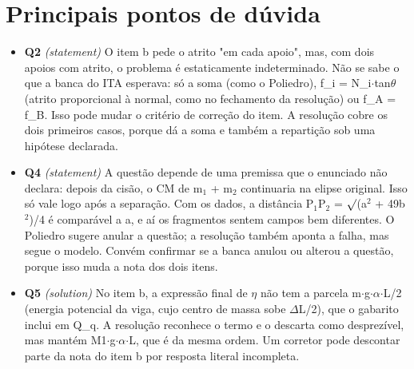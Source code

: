 \documentclass{article}%
\begin{document}
\section*{Principais pontos de dúvida}%
\begin{itemize}%
\item%
\textbf{Q2} \textit{(statement)} O item b pede o atrito "em cada apoio", mas, com dois apoios com atrito, o problema é estaticamente indeterminado. Não se sabe o que a banca do ITA esperava: só a soma (como o Poliedro), f\_i = N\_i$\cdot$tan$\theta$ (atrito proporcional à normal, como no fechamento da resolução) ou f\_A = f\_B. Isso pode mudar o critério de correção do item. A resolução cobre os dois primeiros casos, porque dá a soma e também a repartição sob uma hipótese declarada.%
\item%
\textbf{Q4} \textit{(statement)} A questão depende de uma premissa que o enunciado não declara: depois da cisão, o CM de m$_{1}$ + m$_{2}$ continuaria na elipse original. Isso só vale logo após a separação. Com os dados, a distância P$_{1}$P$_{2}$ = $\surd$(a$^2$ + 49b$^2$)/4 é comparável a a, e aí os fragmentos sentem campos bem diferentes. O Poliedro sugere anular a questão; a resolução também aponta a falha, mas segue o modelo. Convém confirmar se a banca anulou ou alterou a questão, porque isso muda a nota dos dois itens.%
\item%
\textbf{Q5} \textit{(solution)} No item b, a expressão final de $\eta$ não tem a parcela m$\cdot$g$\cdot$$\alpha$$\cdot$L/2 (energia potencial da viga, cujo centro de massa sobe $\Delta$L/2), que o gabarito inclui em Q\_q. A resolução reconhece o termo e o descarta como desprezível, mas mantém M1$\cdot$g$\cdot$$\alpha$$\cdot$L, que é da mesma ordem. Um corretor pode descontar parte da nota do item b por resposta literal incompleta.%
\end{itemize}%
\end{document}
